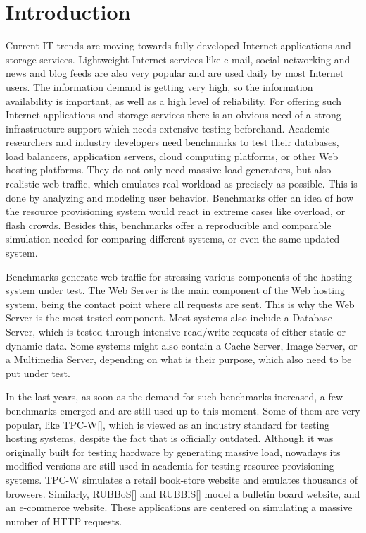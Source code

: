 \chapter{Introduction}
\label{chapter:chapter1}

Current IT trends are moving towards fully developed Internet applications and storage services. Lightweight Internet services like e-mail, social networking and news and blog feeds are also very popular and are used daily by most Internet users. The information demand is getting very high, so the information availability is important, as well as a high level of reliability. For offering such Internet applications and storage services there is an obvious need of a strong infrastructure support which needs extensive testing beforehand. Academic researchers and industry developers need benchmarks to test their databases, load balancers, application servers, cloud computing platforms, or other Web hosting platforms. They do not only need massive load generators, but also realistic web traffic, which emulates real workload as precisely as possible. This is done by analyzing and modeling user behavior. Benchmarks offer an idea of how the resource provisioning system would react in extreme cases like overload, or flash crowds. Besides this, benchmarks offer a reproducible and comparable simulation needed for comparing different systems, or even the same updated system.

Benchmarks generate web traffic for stressing various components of the hosting system under test. The Web Server is the main component of the Web hosting system, being the contact point where all requests are sent. This is why the Web Server is the most tested component. Most systems also include a Database Server, which is tested through intensive read/write requests of either static or dynamic data.  Some systems might also contain a Cache Server, Image Server, or a Multimedia Server, depending on what is their purpose, which also need to be put under test.

In the last years, as soon as the demand for such benchmarks increased, a few benchmarks emerged and are still used up to this moment. Some of them are very popular, like TPC-W[], which is viewed as an industry standard for testing hosting systems, despite the fact that is officially outdated. Although it was originally built for testing hardware by generating massive load, nowadays its modified versions are still used in academia for testing resource provisioning systems.  TPC-W simulates a retail book-store website and emulates thousands of browsers. Similarly, RUBBoS[] and RUBBiS[] model a bulletin board website, and an e-commerce website. These applications are centered on simulating a massive number of HTTP requests.

